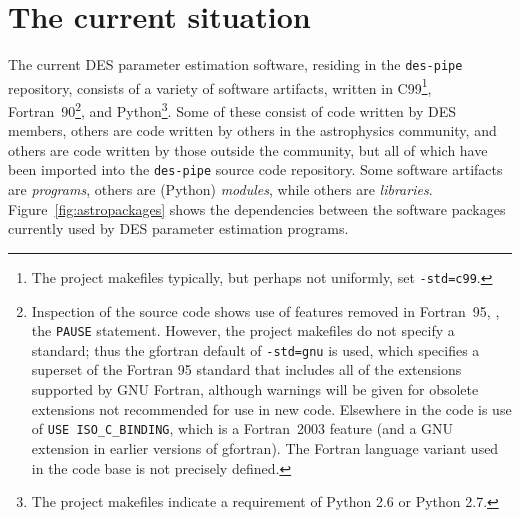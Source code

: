 \documentclass[draftmode,draftwater]{memarticle}
\begin{document}

\section{The current situation\label{sec:current_situation}}

The current DES parameter estimation software, residing in the
\texttt{des-pipe} repository, consists of a variety of software
artifacts, written in C99\footnote{The project makefiles typically, but
  perhaps not uniformly, set \texttt{-std=c99}.},
Fortran~90\footnote{Inspection of the source code shows use of features
  removed in Fortran~95, \eg, the \texttt{PAUSE} statement. However, the
  project makefiles do not specify a standard; thus the gfortran default
  of \texttt{-std=gnu} is used, which specifies a superset of the
  Fortran 95 standard that includes all of the extensions supported by
  GNU Fortran, although warnings will be given for obsolete extensions
  not recommended for use in new code. Elsewhere in the code is
use of \texttt{USE ISO\_C\_BINDING}, which is a Fortran~2003 feature
(and a GNU extension in earlier versions of gfortran). The Fortran
language variant used in the code base is not precisely defined.},
 and Python\footnote{The project makefiles indicate a requirement of
   Python 2.6 or Python 2.7.}.
Some of these consist of code written by DES members, others are code
written by others in the astrophysics community, and others are code
written by those outside the community, but all of which have been
imported into the \texttt{des-pipe} source code repository. Some software artifacts are
\emph{programs}, others are (Python) \emph{modules}, while others are
\emph{libraries}. Figure~\ref{fig:astropackages} shows the dependencies
between the software packages currently used by DES parameter estimation
programs.
\end{document}

